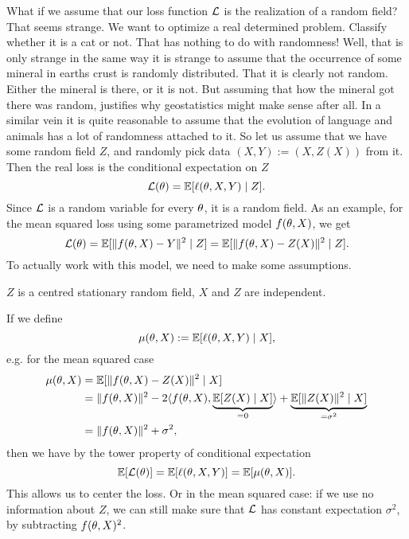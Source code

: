 What if we assume that our loss function \(\mathcal{L}\) is the
realization of a random field? That seems strange. We want to optimize a real
determined problem. Classify whether it is a cat or not. That has nothing to do
with randomness! Well, that is only strange in the same way it is strange to
assume that the occurrence of some mineral in earths crust is randomly
distributed.  That it is clearly not random. Either the mineral is there, or it
is not. But assuming that how the mineral got there was random, justifies why
geostatistics might make sense after all. In a similar vein it is quite
reasonable to assume that the evolution of language and animals has a lot of
randomness attached to it. So let us assume that we have some random field
\(Z\), and randomly pick data \((X,Y) := (X,Z(X))\) from it. Then the real loss
is the conditional expectation on \(Z\)
\begin{equation*}
	\mathcal{L}(\theta) = \mathbb{E}[\ell(\theta, X,Y)\mid Z].
\end{equation*}
Since \(\mathcal{L}\) is a random variable for every \(\theta\), it is a random field.
As an example, for the mean squared loss using some parametrized model
\(f(\theta, X)\), we get
\begin{equation*}
	\mathcal{L}(\theta)
	= \mathbb{E}[\|f(\theta, X) - Y\|^2 \mid Z]
	= \mathbb{E}[\|f(\theta, X) - Z(X)\|^2 \mid Z].
\end{equation*}
To actually work with this model, we need to make some assumptions.

\begin{axiom}
	\(Z\) is a centred stationary random field, \(X\) and \(Z\) are independent.
\end{axiom}

If we define
\begin{equation*}
	\mu(\theta, X):= \mathbb{E}[\ell(\theta, X,Y)\mid X],
\end{equation*}
e.g. for the mean squared case
\begin{align*}
	\mu(\theta, X)&= \mathbb{E}[\|f(\theta, X)-Z(X)\|^2 \mid X]\\
	&= \|f(\theta, X)\|^2 - 2\langle f(\theta, X), \underbrace{\mathbb{E}[Z(X)\mid X]}_{=0}\rangle
	+ \underbrace{\mathbb{E}[\|Z(X)\|^2\mid X]}_{=\sigma^2}\\
	&= \|f(\theta, X)\|^2 + \sigma^2,
\end{align*}
then we have by the tower property of conditional expectation
\begin{equation*}
	\mathbb{E}[\mathcal{L}(\theta)]
	= \mathbb{E}[\ell(\theta, X,Y)]
	= \mathbb{E}[\mu(\theta, X)].
\end{equation*}
This allows us to center the loss. Or in the mean squared case: if we use no
information about \(Z\), we can still make sure that \(\mathcal{L}\) has constant
expectation \(\sigma^2\), by subtracting \(f(\theta, X)^2\).



